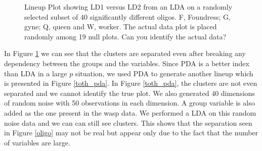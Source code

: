 \documentclass[12]{report}
\begin{document}
\begin{figure}[hbtp]
   \centering
       \caption{Lineup Plot showing LD1 versus LD2 from an LDA on a randomly selected subset of 40 significantly different oligos. F, Foundress; G, gyne; Q, queen and W, worker. The actual data plot is placed randomly among 19 null plots. Can you identify the actual data?  }
       \label{toth_lineup}
\end{figure} 

In Figure \ref{toth_lineup} we can see that the clusters are separated even after breaking any dependency between the groups and the variables. Since PDA is a better index than LDA in a large $p$ situation, we used PDA to generate another lineup which is presented in Figure \ref{toth_pda}. In Figure \ref{toth_pda}, the clusters are not even separated and we cannot identify the true plot. We also generated 40 dimensions of random noise with 50 observations in each dimension. A group variable is also added as the one present in the wasp data. We performed a LDA on this random noise data and we can can still see clusters.  This shows that the separation seen in Figure \ref{oligo} may not be real but appear only due to the fact that the number of variables are large.
\end{document}
